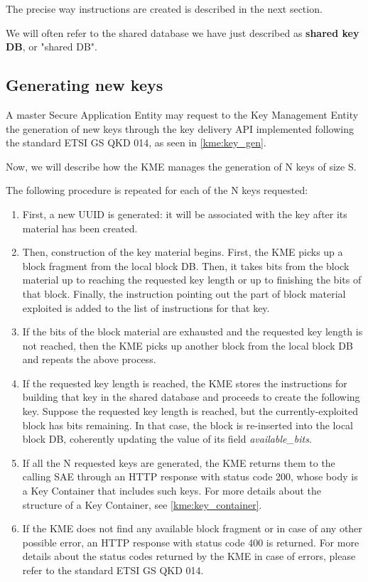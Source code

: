 The precise way instructions are created is described in the next section.

We will often refer to the shared database we have just described as \textbf{shared key DB}, or "shared DB".

\subsection{Generating new keys}
A master Secure Application Entity may request to the Key Management Entity the generation of new keys through the key delivery API implemented following the standard ETSI GS QKD 014, as seen in \ref{kme:key_gen}.

Now, we will describe how the KME manages the generation of N keys of size S.

The following procedure is repeated for each of the N keys requested:

\begin{enumerate}
    \item First, a new UUID is generated: it will be associated with the key after its material has been created.
    \item Then, construction of the key material begins. First, the KME picks up a block fragment from the local block DB. Then, it takes bits from the block material up to reaching the requested key length or up to finishing the bits of that block. Finally, the instruction pointing out the part of block material exploited is added to the list of instructions for that key.
    \item If the bits of the block material are exhausted and the requested key length is not reached, then the KME picks up another block from the local block DB and repeats the above process. 
    \item If the requested key length is reached, the KME stores the instructions for building that key in the shared database and proceeds to create the following key. Suppose the requested key length is reached, but the currently-exploited block has bits remaining. In that case, the block is re-inserted into the local block DB, coherently updating the value of its field \textit{available\_bits}.
    \item If all the N requested keys are generated, the KME returns them to the calling SAE through an HTTP response with status code 200, whose body is a Key Container that includes such keys. For more details about the structure of a Key Container, see \ref{kme:key_container}.
    \item If the KME does not find any available block fragment or in case of any other possible error, an HTTP response with status code 400 is returned. For more details about the status codes returned by the KME in case of errors, please refer to the standard ETSI GS QKD 014.
\end{enumerate}

